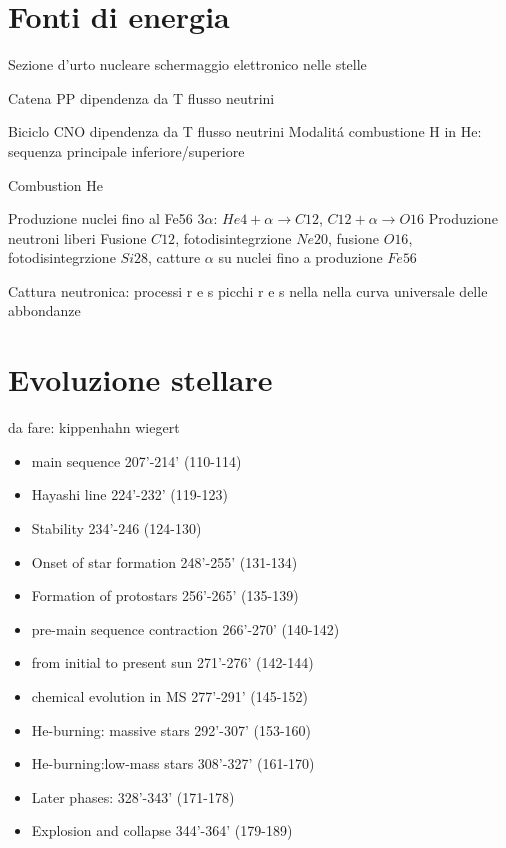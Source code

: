 \section{Fonti di energia}

\begin{frame}{Sezione d'urto nucleare}
schermaggio elettronico nelle stelle
\end{frame}

\begin{frame}{Catena PP}
dipendenza da T
flusso neutrini
\end{frame}

\begin{frame}{Biciclo CNO}
dipendenza da T
flusso neutrini
Modalit\'a combustione H in He: sequenza principale inferiore/superiore
\end{frame}

\begin{frame}{Combustion He}

\end{frame}

\begin{frame}{Produzione nuclei fino al Fe56}
3$\alpha$: $He4+\alpha\to C12$, $C12+\alpha\to O16$
Produzione neutroni liberi
Fusione $C12$, fotodisintegrzione $Ne20$, fusione $O16$, fotodisintegrzione $Si28$, catture $\alpha$ su nuclei fino a produzione $Fe56$
\end{frame}

\begin{frame}{Cattura neutronica: processi r e s}
picchi r e s nella nella curva universale delle abbondanze
\end{frame}

\section{Evoluzione stellare}

\begin{wordonframe}{da fare: kippenhahn wiegert}
\begin{itemize}
\item main sequence 207'-214' (110-114)
\item Hayashi line 224'-232' (119-123)
\item Stability 234'-246 (124-130)
\item Onset of star formation 248'-255' (131-134)
\item Formation of protostars 256'-265' (135-139)
\item pre-main sequence contraction 266'-270' (140-142)
\item from initial to present sun 271'-276' (142-144)
\item chemical evolution in MS 277'-291' (145-152)
\item He-burning: massive stars 292'-307' (153-160)
\item He-burning:low-mass stars 308'-327' (161-170)
\item Later phases:  328'-343' (171-178)
\item Explosion and collapse 344'-364' (179-189)
\end{itemize}
\end{wordonframe}

